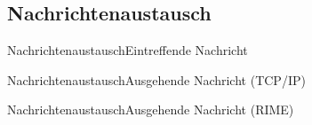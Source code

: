 \subsection{Nachrichtenaustausch}
\begin{frame}{Nachrichtenaustausch}{Eintreffende Nachricht}
	
\end{frame}
\begin{frame}{Nachrichtenaustausch}{Ausgehende Nachricht (TCP/IP)}
	
\end{frame}
\begin{frame}{Nachrichtenaustausch}{Ausgehende Nachricht (RIME)}
	
\end{frame}
%	
%	
%	
%	
%	

